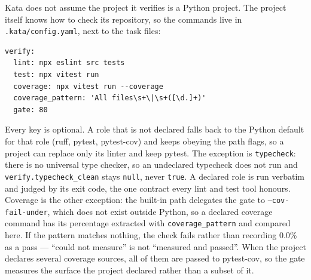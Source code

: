 \documentclass{sbc2019}%
\begin{document}
Kata does not assume the project it verifies is a Python project. The
project itself knows how to check its repository, so the commands live in
\texttt{.kata/config.yaml}, next to the task files:

\begin{lstlisting}[caption=Declaring the verification commands of a non-Python project.]
verify:
  lint: npx eslint src tests
  test: npx vitest run
  coverage: npx vitest run --coverage
  coverage_pattern: 'All files\s+\|\s+([\d.]+)'
  gate: 80
\end{lstlisting}

Every key is optional. A role that is not declared falls back to the
Python default for that role (ruff, pytest, pytest-cov) and keeps obeying
the path flags, so a project can replace only its linter and keep pytest.
The exception is \texttt{typecheck}: there is no universal type checker, so
an undeclared typecheck does not run and \texttt{verify.typecheck\_clean}
stays \texttt{null}, never \texttt{true}. A declared role is run verbatim
and judged by its exit code, the one contract every lint and test tool
honours. Coverage is the other exception: the built-in path delegates the
gate to \texttt{--cov-fail-under}, which does not exist outside Python, so a
declared coverage command has its percentage extracted with
\texttt{coverage\_pattern} and compared here. If the pattern matches nothing,
the check fails rather than recording 0.0\% as a pass --- ``could not
measure'' is not ``measured and passed''. When the project declares several
coverage sources, all of them are passed to pytest-cov, so the gate measures
the surface the project declared rather than a subset of it.
\end{document}
